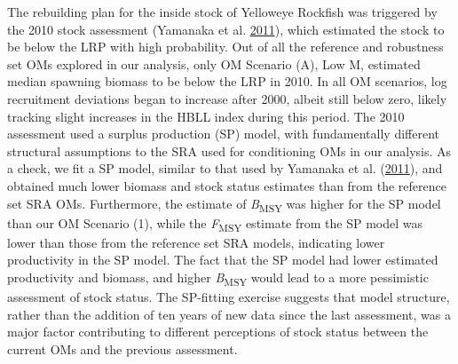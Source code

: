 \documentclass[11pt]{book}
\begin{document}
The rebuilding plan for the inside stock of Yelloweye Rockfish was triggered by the 2010 stock assessment (Yamanaka et al. \protect\hyperlink{ref-yamanaka2011}{2011}), which estimated the stock to be below the LRP with high probability. Out of all the reference and robustness set OMs explored in our analysis, only OM Scenario (A), Low M, estimated median spawning biomass to be below the LRP in 2010. In all OM scenarios, log recruitment deviations began to increase after 2000, albeit still below zero, likely tracking slight increases in the HBLL index during this period. The 2010 assessment used a surplus production (SP) model, with fundamentally different structural assumptions to the SRA used for conditioning OMs in our analysis. As a check, we fit a SP model, similar to that used by Yamanaka et al. (\protect\hyperlink{ref-yamanaka2011}{2011}), and obtained much lower biomass and stock status estimates than from the reference set SRA OMs. Furthermore, the estimate of \emph{B}\textsubscript{MSY} was higher for the SP model than our OM Scenario (1), while the \emph{F}\textsubscript{MSY} estimate from the SP model was lower than those from the reference set SRA models, indicating lower productivity in the SP model. The fact that the SP model had lower estimated productivity and biomass, and higher \emph{B}\textsubscript{MSY} would lead to a more pessimistic assessment of stock status. The SP-fitting exercise suggests that model structure, rather than the addition of ten years of new data since the last assessment, was a major factor contributing to different perceptions of stock status between the current OMs and the previous assessment.
\end{document}
